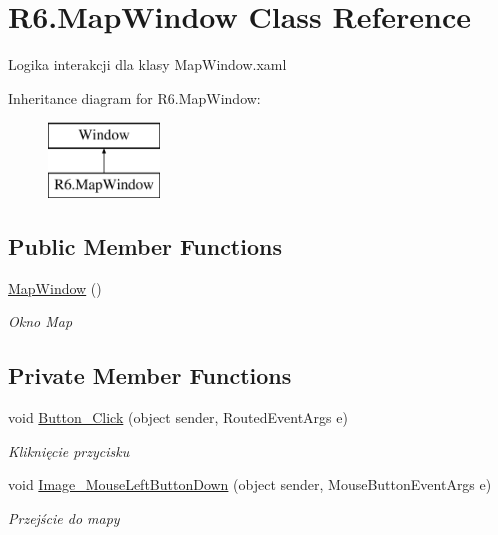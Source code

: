 \hypertarget{class_r6_1_1_map_window}{}\section{R6.\+Map\+Window Class Reference}
\label{class_r6_1_1_map_window}


Logika interakcji dla klasy Map\+Window.\+xaml  


Inheritance diagram for R6.\+Map\+Window\+:\begin{figure}[H]
\begin{center}
\leavevmode
\includegraphics[height=2.000000cm]{class_r6_1_1_map_window}
\end{center}
\end{figure}
\subsection*{Public Member Functions}
\begin{DoxyCompactItemize}
\item 
\mbox{\hyperlink{class_r6_1_1_map_window_aada661b10260b40a63eb9885ae4e7d07}{Map\+Window}} ()
\begin{DoxyCompactList}\small\item\em Okno Map \end{DoxyCompactList}\end{DoxyCompactItemize}
\subsection*{Private Member Functions}
\begin{DoxyCompactItemize}
\item 
void \mbox{\hyperlink{class_r6_1_1_map_window_a976927b4bcb1d1bb2ff8e9967b0f61ff}{Button\+\_\+\+Click}} (object sender, Routed\+Event\+Args e)
\begin{DoxyCompactList}\small\item\em Kliknięcie przycisku \end{DoxyCompactList}\item 
void \mbox{\hyperlink{class_r6_1_1_map_window_a96a1b5a90b7741db29b019f02a1a0f59}{Image\+\_\+\+Mouse\+Left\+Button\+Down}} (object sender, Mouse\+Button\+Event\+Args e)
\begin{DoxyCompactList}\small\item\em Przejście do mapy \end{DoxyCompactList}\end{DoxyCompactItemize}


